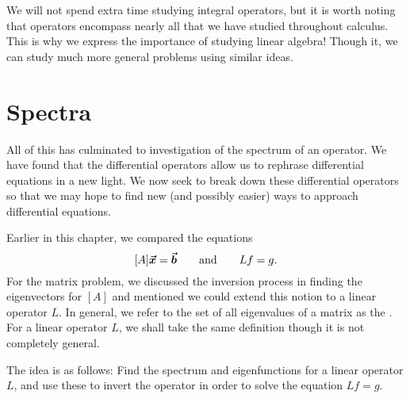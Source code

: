 We will not spend extra time studying integral operators, but it is worth noting that operators encompass nearly all that we have studied throughout calculus.  This is why we express the importance of studying linear algebra! Though it, we can study much more general problems using similar ideas.

\section{Spectra}

All of this has culminated to investigation of the spectrum of an operator. We have found that the differential operators allow us to rephrase differential equations in a new light. We now seek to break down these differential operators so that we may hope to find new (and possibly easier) ways to approach differential equations.

Earlier in this chapter, we compared the equations
\[
[A]\boldsymbol{\boldsymbol{\vec{x}}} = \boldsymbol{\vec{b}} \qquad \textrm{and} \qquad Lf=g.
\]
For the matrix problem, we discussed the inversion process in finding the eigenvectors for $[A]$ and mentioned we could extend this notion to a linear operator $L$.  In general, we refer to the set of all eigenvalues of a matrix as the . For a linear operator $L$, we shall take the same definition though it is not completely general.

The idea is as follows: Find the spectrum and eigenfunctions for a linear operator $L$, and use these to invert the operator in order to solve the equation $Lf=g$.

